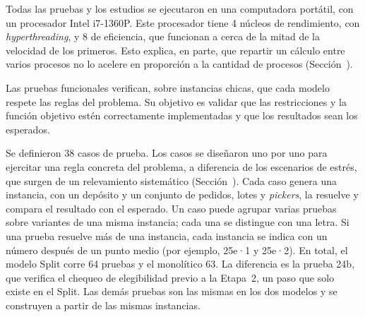 Todas las pruebas y los estudios se ejecutaron en una computadora
portátil, con un procesador Intel i7-1360P. Este procesador tiene 4 núcleos de
rendimiento, con {\em hyperthreading}, y 8 de eficiencia, que funcionan a
cerca de la mitad de la velocidad de los primeros. Esto explica, en parte,
que repartir un cálculo entre varios procesos no lo acelere en proporción a
la cantidad de procesos (Sección~).

\stopsection

\startsection[title={Pruebas funcionales}, reference=sec:pruebas_funcionales]

Las pruebas funcionales verifican, sobre instancias chicas, que cada modelo
respete las reglas del problema. Su objetivo es validar que las restricciones
y la función objetivo estén correctamente implementadas y que los resultados
sean los esperados.

Se definieron 38 casos de prueba. Los casos se diseñaron uno por uno para
ejercitar una regla concreta del problema, a diferencia de los escenarios de
estrés, que surgen de un relevamiento sistemático
(Sección~). Cada caso genera una instancia,
con un depósito y un conjunto de pedidos, lotes y {\em pickers}, la resuelve y 
compara el resultado con el esperado. Un caso puede agrupar varias pruebas sobre
variantes de una misma instancia; cada una se distingue con una letra. Si
una prueba resuelve más de una instancia, cada instancia se indica con un
número después de un punto medio (por ejemplo, 25e·1 y 25e·2). En
total, el modelo Split corre 64 pruebas y el monolítico 63. La diferencia es
la prueba 24b, que verifica el chequeo de elegibilidad previo a la Etapa~2, un
paso que solo existe en el Split. Las demás pruebas son las mismas en los dos
modelos y se construyen a partir de las mismas instancias.

